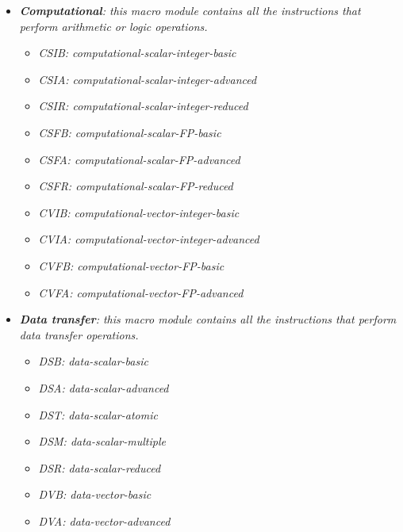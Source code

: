 \documentclass{article}
\begin{document}
        \begin{itemize}

           \item \textit{\textbf{Computational}: this macro module contains all the instructions that perform arithmetic or logic operations.}

                \begin{itemize}

                    \item \textit{CSIB: computational-scalar-integer-basic}
                    \item \textit{CSIA: computational-scalar-integer-advanced}
                    \item \textit{CSIR: computational-scalar-integer-reduced}
                    \item \textit{CSFB: computational-scalar-FP-basic}
                    \item \textit{CSFA: computational-scalar-FP-advanced}
                    \item \textit{CSFR: computational-scalar-FP-reduced}
                    \item \textit{CVIB: computational-vector-integer-basic}
                    \item \textit{CVIA: computational-vector-integer-advanced}
                    \item \textit{CVFB: computational-vector-FP-basic}
                    \item \textit{CVFA: computational-vector-FP-advanced}

                \end{itemize}

           \item \textit{\textbf{Data transfer}: this macro module contains all the instructions that perform data transfer operations.}

                \begin{itemize}

                    \item \textit{DSB: data-scalar-basic}
                    \item \textit{DSA: data-scalar-advanced}
                    \item \textit{DST: data-scalar-atomic}
                    \item \textit{DSM: data-scalar-multiple}
                    \item \textit{DSR: data-scalar-reduced}
                    \item \textit{DVB: data-vector-basic}
                    \item \textit{DVA: data-vector-advanced}


\end{itemize}
\end{itemize}
\end{document}
